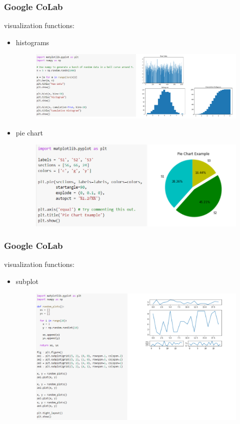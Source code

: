 \documentclass{beamer}
\begin{document}
\begin{frame}
\frametitle{Google CoLab}
visualization functions: 
\begin{itemize}
  \item histograms
        \begin{figure}
        \includegraphics[width=0.7\linewidth]{Seminar_2_images/Google_Colab/histogram.png}
        \end{figure}
  \item pie chart
        \begin{figure}
        \includegraphics[width=0.7\linewidth]{Seminar_2_images/Google_Colab/pieChart.png}
        \end{figure}
\end{itemize}
\end{frame}

\begin{frame}
\frametitle{Google CoLab}
visualization functions: 
\begin{itemize}
  \item subplot
        \begin{figure}
        \includegraphics[width=0.8\linewidth]{Seminar_2_images/Google_Colab/subplotting.png}
        \end{figure}
\end{itemize}
\end{frame}
\end{document}
